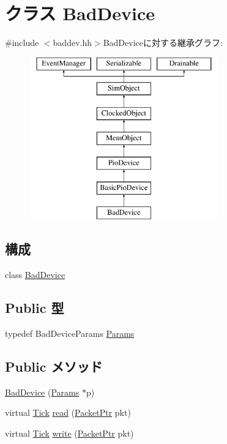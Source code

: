 \hypertarget{classBadDevice}{
\section{クラス BadDevice}
\label{classBadDevice}
}


{\ttfamily \#include $<$baddev.hh$>$}BadDeviceに対する継承グラフ:\begin{figure}[H]
\begin{center}
\leavevmode
\includegraphics[height=7cm]{classBadDevice}
\end{center}
\end{figure}
\subsection*{構成}
\begin{DoxyCompactItemize}
\item 
class \hyperlink{classBadDevice_1_1BadDevice}{BadDevice}
\end{DoxyCompactItemize}
\subsection*{Public 型}
\begin{DoxyCompactItemize}
\item 
typedef BadDeviceParams \hyperlink{classBadDevice_af753d1777865d13ff644f3ce8b944d6b}{Params}
\end{DoxyCompactItemize}
\subsection*{Public メソッド}
\begin{DoxyCompactItemize}
\item 
\hyperlink{classBadDevice_a53ea8f590f0b05fb193659b62cfa4b80}{BadDevice} (\hyperlink{classBadDevice_af753d1777865d13ff644f3ce8b944d6b}{Params} $\ast$p)
\item 
virtual \hyperlink{base_2types_8hh_a5c8ed81b7d238c9083e1037ba6d61643}{Tick} \hyperlink{classBadDevice_a613ec7d5e1ec64f8d21fec78ae8e568e}{read} (\hyperlink{classPacket}{PacketPtr} pkt)
\item 
virtual \hyperlink{base_2types_8hh_a5c8ed81b7d238c9083e1037ba6d61643}{Tick} \hyperlink{classBadDevice_a4cefab464e72b5dd42c003a0a4341802}{write} (\hyperlink{classPacket}{PacketPtr} pkt)
\end{DoxyCompactItemize}
